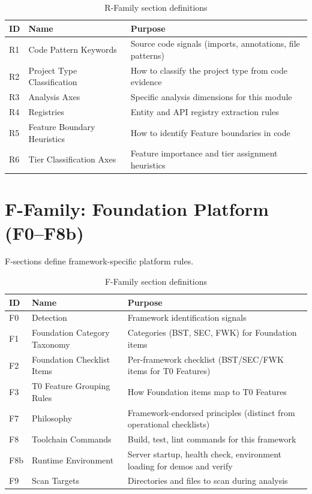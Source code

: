 \documentclass[11pt,a4paper,openright,twoside]{report}
\begin{document}
\begin{table}[H]
\centering
\caption{R-Family section definitions}
\label{tab:r-sections}
\begin{tabularx}{\textwidth}{llX}
\toprule
\textbf{ID} & \textbf{Name} & \textbf{Purpose} \\
\midrule
R1 & Code Pattern Keywords & Source code signals (imports, annotations, file patterns) \\
R2 & Project Type Classification & How to classify the project type from code evidence \\
R3 & Analysis Axes & Specific analysis dimensions for this module \\
R4 & Registries & Entity and API registry extraction rules \\
R5 & Feature Boundary Heuristics & How to identify Feature boundaries in code \\
R6 & Tier Classification Axes & Feature importance and tier assignment heuristics \\
\bottomrule
\end{tabularx}
\end{table}

\section{F-Family: Foundation Platform (F0--F8b)}

F-sections define framework-specific platform rules.

\begin{table}[H]
\centering
\caption{F-Family section definitions}
\label{tab:f-sections}
\begin{tabularx}{\textwidth}{llX}
\toprule
\textbf{ID} & \textbf{Name} & \textbf{Purpose} \\
\midrule
F0 & Detection & Framework identification signals \\
F1 & Foundation Category Taxonomy & Categories (BST, SEC, FWK) for Foundation items \\
F2 & Foundation Checklist Items & Per-framework checklist (BST/SEC/FWK items for T0 Features) \\
F3 & T0 Feature Grouping Rules & How Foundation items map to T0 Features \\
F7 & Philosophy & Framework-endorsed principles (distinct from operational checklists) \\
F8 & Toolchain Commands & Build, test, lint commands for this framework \\
F8b & Runtime Environment & Server startup, health check, environment loading for demos and verify \\
F9 & Scan Targets & Directories and files to scan during analysis \\
\bottomrule
\end{tabularx}
\end{table}
\end{document}
